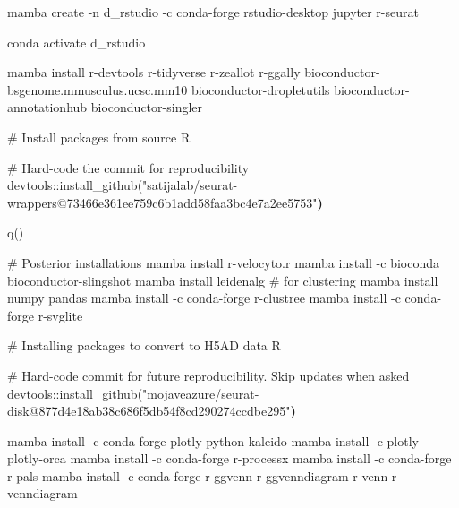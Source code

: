 \documentclass[
  letterpaper,
  DIV=11,
  numbers=noendperiod]{scrreprt}
\newenvironment{Shaded}{\begin{snugshade}}{\end{snugshade}}
\newcommand{\AttributeTok}[1]{\textcolor[rgb]{0.40,0.45,0.13}{#1}}
\newcommand{\CommentTok}[1]{\textcolor[rgb]{0.37,0.37,0.37}{#1}}
\newcommand{\ErrorTok}[1]{\textcolor[rgb]{0.68,0.00,0.00}{#1}}
\newcommand{\ExtensionTok}[1]{\textcolor[rgb]{0.00,0.23,0.31}{#1}}
\newcommand{\FunctionTok}[1]{\textcolor[rgb]{0.28,0.35,0.67}{#1}}
\newcommand{\KeywordTok}[1]{\textcolor[rgb]{0.00,0.23,0.31}{\textbf{#1}}}
\newcommand{\NormalTok}[1]{\textcolor[rgb]{0.00,0.23,0.31}{#1}}
\newcommand{\StringTok}[1]{\textcolor[rgb]{0.13,0.47,0.30}{#1}}
\begin{document}
\begin{Shaded}
\begin{Highlighting}[]
\ExtensionTok{mamba}\NormalTok{ create }\AttributeTok{{-}n}\NormalTok{ d\_rstudio }\AttributeTok{{-}c}\NormalTok{ conda{-}forge rstudio{-}desktop jupyter r{-}seurat}

\ExtensionTok{conda}\NormalTok{ activate d\_rstudio}

\ExtensionTok{mamba}\NormalTok{ install r{-}devtools r{-}tidyverse r{-}zeallot r{-}ggally bioconductor{-}bsgenome.mmusculus.ucsc.mm10 bioconductor{-}dropletutils bioconductor{-}annotationhub bioconductor{-}singler}

\CommentTok{\# Install packages from source}
\ExtensionTok{R}

\CommentTok{\# Hard{-}code the commit for reproducibility}
\ExtensionTok{devtools::install\_github}\ErrorTok{(}\StringTok{"satijalab/seurat{-}wrappers@73466e361ee759c6b1add58faa3bc4e7a2ee5753"}\KeywordTok{)}

\FunctionTok{q()}

\CommentTok{\# Posterior installations}
\ExtensionTok{mamba}\NormalTok{ install r{-}velocyto.r}
\ExtensionTok{mamba}\NormalTok{ install }\AttributeTok{{-}c}\NormalTok{ bioconda bioconductor{-}slingshot}
\ExtensionTok{mamba}\NormalTok{ install leidenalg }\CommentTok{\# for clustering}
\ExtensionTok{mamba}\NormalTok{ install numpy pandas}
\ExtensionTok{mamba}\NormalTok{ install }\AttributeTok{{-}c}\NormalTok{ conda{-}forge r{-}clustree}
\ExtensionTok{mamba}\NormalTok{ install }\AttributeTok{{-}c}\NormalTok{ conda{-}forge r{-}svglite}

\CommentTok{\# Installing packages to convert to H5AD data}
\ExtensionTok{R}

\CommentTok{\# Hard{-}code commit for future reproducibility. Skip updates when asked}
\ExtensionTok{devtools::install\_github}\ErrorTok{(}\StringTok{"mojaveazure/seurat{-}disk@877d4e18ab38c686f5db54f8cd290274ccdbe295"}\KeywordTok{)}


\ExtensionTok{mamba}\NormalTok{ install }\AttributeTok{{-}c}\NormalTok{ conda{-}forge plotly python{-}kaleido}
\ExtensionTok{mamba}\NormalTok{ install }\AttributeTok{{-}c}\NormalTok{ plotly plotly{-}orca}
\ExtensionTok{mamba}\NormalTok{ install }\AttributeTok{{-}c}\NormalTok{ conda{-}forge r{-}processx}
\ExtensionTok{mamba}\NormalTok{ install }\AttributeTok{{-}c}\NormalTok{ conda{-}forge r{-}pals}
\ExtensionTok{mamba}\NormalTok{ install }\AttributeTok{{-}c}\NormalTok{ conda{-}forge r{-}ggvenn r{-}ggvenndiagram r{-}venn r{-}venndiagram}
\end{Highlighting}
\end{Shaded}
\end{document}
